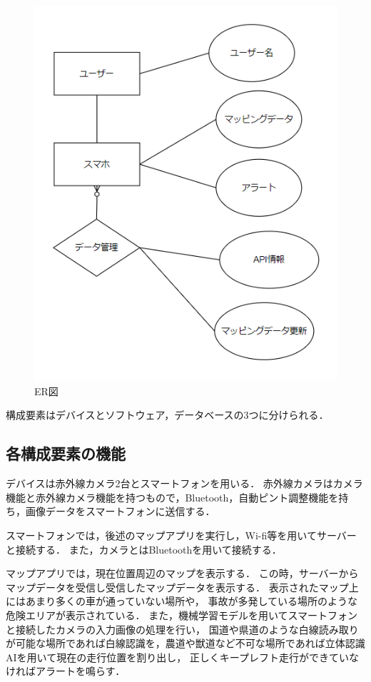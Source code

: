 \documentclass[titlepage,a4paper]{jsarticle}
\begin{document}
\begin{figure}[H]
  \centering
  \includegraphics[width=\textwidth]{img/ER_fig.png}
  \caption{ER図}
  \label{ER図}
\end{figure}

構成要素はデバイスとソフトウェア，データベースの3つに分けられる．
\subsection{各構成要素の機能}\label{構成要素}
デバイスは赤外線カメラ2台とスマートフォンを用いる．
赤外線カメラはカメラ機能と赤外線カメラ機能を持つもので，Bluetooth，自動ピント調整機能を持ち，画像データをスマートフォンに送信する．

スマートフォンでは，後述のマップアプリを実行し，Wi-fi等を用いてサーバーと接続する．
また，カメラとはBluetoothを用いて接続する．

マップアプリでは，現在位置周辺のマップを表示する．
この時，サーバーからマップデータを受信し受信したマップデータを表示する．
表示されたマップ上にはあまり多くの車が通っていない場所や，
事故が多発している場所のような危険エリアが表示されている．
また，機械学習モデルを用いてスマートフォンと接続したカメラの入力画像の処理を行い，
国道や県道のような白線読み取りが可能な場所であれば白線認識を，農道や獣道など不可な場所であれば立体認識AIを用いて現在の走行位置を割り出し，
正しくキープレフト走行ができていなければアラートを鳴らす．
\end{document}
